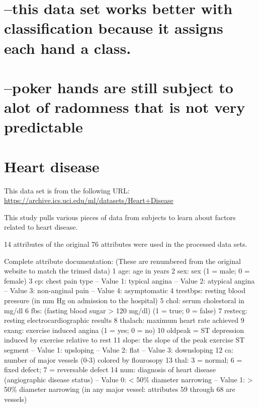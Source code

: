 \documentclass[]{article}
\begin{document}
\section{--this data set works better with classification because it
assigns each hand a
class.}\label{this-data-set-works-better-with-classification-because-it-assigns-each-hand-a-class.}

\section{--poker hands are still subject to alot of radomness that is
not very
predictable}\label{poker-hands-are-still-subject-to-alot-of-radomness-that-is-not-very-predictable}

\section{Heart disease}\label{heart-disease}

This data set is from the following URL:
\url{https://archive.ics.uci.edu/ml/datasets/Heart+Disease}

This study pulls various pieces of data from subjects to learn about
factors related to heart disease.

14 attributes of the original 76 attributes were used in the processed
data sets.

Complete attribute documentation: (These are renumbered from the
original website to match the trimed data) 1 age: age in years 2 sex:
sex (1 = male; 0 = female) 3 cp: chest pain type -- Value 1: typical
angina -- Value 2: atypical angina -- Value 3: non-anginal pain -- Value
4: asymptomatic 4 trestbps: resting blood pressure (in mm Hg on
admission to the hospital) 5 chol: serum cholestoral in mg/dl 6 fbs:
(fasting blood sugar \textgreater{} 120 mg/dl) (1 = true; 0 = false) 7
restecg: resting electrocardiographic results 8 thalach: maximum heart
rate achieved 9 exang: exercise induced angina (1 = yes; 0 = no) 10
oldpeak = ST depression induced by exercise relative to rest 11 slope:
the slope of the peak exercise ST segment -- Value 1: upsloping -- Value
2: flat -- Value 3: downsloping 12 ca: number of major vessels (0-3)
colored by flourosopy 13 thal: 3 = normal; 6 = fixed defect; 7 =
reversable defect 14 num: diagnosis of heart disease (angiographic
disease status) -- Value 0: \textless{} 50\% diameter narrowing -- Value
1: \textgreater{} 50\% diameter narrowing (in any major vessel:
attributes 59 through 68 are vessels)
\end{document}
